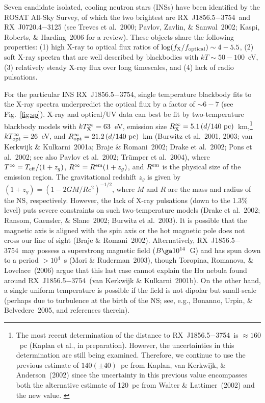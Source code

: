 \documentclass[useAMS,usegraphicx]{mn2e}
\newcommand{\etal}{et al.}
\newcommand{\rxjw}{RX~J1856.5$-$3754}
\newcommand{\zg}{z_g}
\newcommand{\teff}{\ensuremath{T_{\rm eff}}}
\newcommand{\rem}{\ensuremath{R^{\rm em}}}
\newcommand{\tinfty}{\ensuremath{T^{\infty}}}
\newcommand{\rinfty}{\ensuremath{R^{\infty}}}
\begin{document}
Seven candidate isolated, cooling neutron stars (INSs) have
been identified by the ROSAT All-Sky Survey, of which the two brightest
are \rxjw\ and RX~J0720.4$-$3125
(see Treves \etal~2000; Pavlov, Zavlin, \& Sanwal~2002;
Kaspi, Roberts, \& Harding~2006
for a review).  These objects share the following properties: (1) high
X-ray to optical flux ratios of $\log(f_{\rm X}/f_{\rm optical})\sim 4-5.5$,
(2) soft X-ray spectra that are well described by blackbodies with
$kT\sim 50-100$~eV, (3) relatively steady X-ray flux over long timescales,
and (4) lack of radio pulsations.

For the particular INS \rxjw,
single temperature blackbody fits to the X-ray spectra
underpredict the optical flux by a factor of $\sim 6-7$
(see Fig.~\ref{fig:sp}).
X-ray and optical/UV data can best be fit by two-temperature
blackbody models with
$k\tinfty_{\rm X}=63$~eV, emission size
$\rinfty_{\rm X}=5.1\,(d/\mbox{140 pc})$~km,\footnote{The most
recent determination of the distance to \rxjw\ is $\approx 160$~pc
(Kaplan \etal, in preparation).  However, the uncertainties in this
determination are still being examined.  Therefore, we continue to use
the previous estimate of $140 (\pm 40)$~pc from Kaplan, van Kerkwijk,
\& Anderson~(2002) since the uncertainty in this previous value
encompasses both the alternative estimate of 120~pc from
Walter \& Lattimer~(2002) and the new value. \label{foot:distance}}
$k\tinfty_{\rm opt}=26$~eV, and
$\rinfty_{\rm opt}=21.2\,(d/\mbox{140 pc})$~km
(Burwitz \etal~2001, 2003; van Kerkwijk \& Kulkarni~2001a;
Braje \& Romani~2002; Drake \etal~2002; Pons \etal~2002;
see also Pavlov \etal~2002; Tr\"{u}mper \etal~2004),
where $\tinfty=\teff/(1+\zg)$, $\rinfty=\rem(1+\zg)$,
and $\rem$ is the physical size of the emission region.
The gravitational redshift $\zg$ is given by $(1+\zg)=(1-2GM/Rc^2)^{-1/2}$,
where $M$ and $R$ are the mass and radius of the NS, respectively.
However, the lack of X-ray pulsations (down to the 1.3\% level)
puts severe constraints on such two-temperature models
(Drake \etal~2002; Ransom, Gaensler, \& Slane~2002; Burwitz \etal~2003).
It is possible that the magnetic axis is aligned with the
spin axis or the hot magnetic pole does not cross our line of sight
(Braje \& Romani~2002).  Alternatively, \rxjw\ may possess a superstrong
magnetic field ($B\ga 10^{14}$~G) and has spun down to a period $> 10^4$~s
(Mori \& Ruderman~2003),
though Toropina, Romanova, \& Lovelace~(2006) argue that this last case
cannot explain the H$\alpha$ nebula found around \rxjw\
(van Kerkwijk \& Kulkarni~2001b).
On the other hand, a single uniform temperature is possible
if the field is not dipolar but small-scale (perhaps due to turbulence
at the birth of the NS; see, e.g., Bonanno, Urpin, \& Belvedere~2005,
and references therein).
\end{document}
